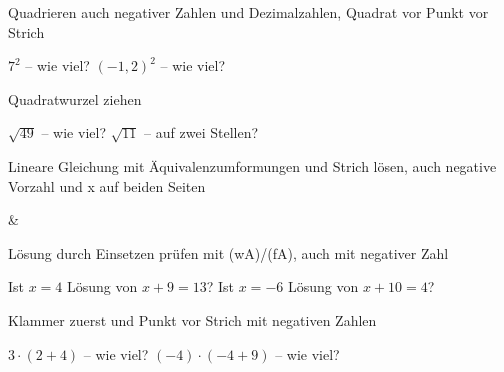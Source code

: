 \setcounter{aufgabe}{0}

\begin{aufgabe}{Quadrieren auch negativer Zahlen und Dezimalzahlen, Quadrat vor Punkt vor Strich}
\begin{teile}
\teil $7^2$ – wie viel? \leerfeld
\teil $(-1{,}2)^2$ – wie viel? \leerfeld
\end{teile}
\end{aufgabe}

\begin{aufgabe}{Quadratwurzel ziehen}
\begin{teile}
\teil $\sqrt{49}$ – wie viel? \leerfeld
\teil $\sqrt{11}$ – auf zwei Stellen? \leerfeld
\end{teile}
\end{aufgabe}

\begin{aufgabe}{Lineare Gleichung mit Äquivalenzumformungen und Strich lösen, auch negative Vorzahl und x auf beiden Seiten}
\begin{gleichungsraster}[2]
 &
 \\
\end{gleichungsraster}
\end{aufgabe}

\begin{aufgabe}{Lösung durch Einsetzen prüfen mit (wA)/(fA), auch mit negativer Zahl}
\begin{teile}
\teil Ist $x = 4$ Lösung von $x + 9 = 13$? \janein
\teil Ist $x = -6$ Lösung von $x + 10 = 4$? \janein
\end{teile}
\end{aufgabe}

\begin{aufgabe}{Klammer zuerst und Punkt vor Strich mit negativen Zahlen}
\begin{teile}
\teil $3 \cdot (2 + 4)$ – wie viel? \leerfeld
\teil $(-4) \cdot (-4 + 9)$ – wie viel? \leerfeld
\end{teile}
\end{aufgabe}

